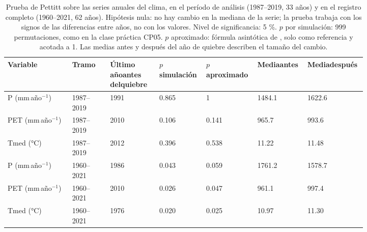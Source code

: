 \begin{table}[ht]
\centering
\caption{Prueba de Pettitt \citep{Pettitt1979} sobre las series anuales del
clima, en el período de análisis (1987--2019, 33 años) y en el registro
completo (1960--2021, 62 años). Hipótesis nula: no hay cambio en la mediana
de la serie; la prueba trabaja con los signos de las diferencias entre años,
no con los valores. Nivel de significancia: 5 \%. $p$ por simulación: 999
permutaciones, como en la clase práctica CP05. $p$ aproximado: fórmula
asintótica de \citet{Pettitt1979}, solo como referencia y acotada a 1. Las
medias antes y después del año de quiebre describen el tamaño del cambio.}
\label{tab:E02pettitt}
\begin{tabular}{|p{0.17\linewidth}|p{0.1\linewidth}|p{0.13\linewidth}|p{0.11\linewidth}|p{0.11\linewidth}|p{0.1\linewidth}|p{0.1\linewidth}|}
\hline
Variable & Tramo & Último año\newline antes del\newline quiebre & $p$\newline simulación & $p$\newline aproximado & Media\newline antes & Media\newline después \\
\hline
P (mm\,año$^{-1}$) & 1987--2019 & 1991 & 0.865 & 1 & 1484.1 & 1622.6 \\
\hline
PET (mm\,año$^{-1}$) & 1987--2019 & 2010 & 0.106 & 0.141 & 965.7 & 993.6 \\
\hline
Tmed (°C) & 1987--2019 & 2012 & 0.396 & 0.538 & 11.22 & 11.48 \\
\hline
P (mm\,año$^{-1}$) & 1960--2021 & 1986 & 0.043 & 0.059 & 1761.2 & 1578.7 \\
\hline
PET (mm\,año$^{-1}$) & 1960--2021 & 2010 & 0.026 & 0.047 & 961.1 & 997.4 \\
\hline
Tmed (°C) & 1960--2021 & 1976 & 0.020 & 0.025 & 10.97 & 11.30 \\
\hline
\end{tabular}
\end{table}

